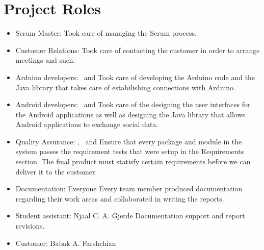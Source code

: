 \section{Project Roles}
\begin{itemize}
	\item{Scrum Master:} \henrik\newline
	Took care of managing the Scrum process.
	
	\item{Customer Relations:} \henrik\newline
	Took care of contacting the customer in order to arrange meetings and such.

	\item{Arduino developers:} \anders~and \bjornar\newline
	Took care of developing the Arduino code and the Java library that takes
	care of estabilishing connections with Arduino.

	\item{Android developers:} \emanuele~and \henrik\newline
	Took care of the designing the user interfaces for the Android applications
	as well as designing the Java library that allows Android applications
	to exchange social data.
	
	\item{Quality Assurance:} \johan, \asbjorn~and \jonas\newline
	Ensure that every package and module in the system passes the requirement tests
	that were setup in the Requirements section. The final product must statisfy certain
	requirements before we can deliver it to the customer.

	\item{Documentation:} Everyone\newline
	Every team member produced documentation regarding their work areas and
	collaborated in writing the reports.

	\item{Student assistant:} Njaal C. A. Gjerde\newline
	Documentation support and report revisions.

	\item{Customer:} Babak A. Farshchian
\end{itemize}

\newpage

